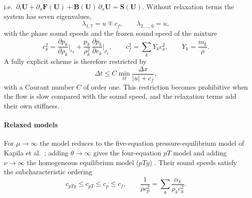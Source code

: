 \documentclass[a4paper,fleqn]{cas-sc}
\begin{document}
i.e.\ $\partial_t\mathbf U+\partial_x\mathbf F(\mathbf U)+\mathbf B(\mathbf U)\,\partial_x\mathbf U=\mathbf S(\mathbf U)$. Without relaxation terms the system has seven eigenvalues,
\begin{equation}
\lambda_{1,7}=u\mp c_f,\qquad \lambda_{2,\dots,6}=u,
\label{eq:eigs}
\end{equation}
with the phase sound speeds and the frozen sound speed of the mixture
\begin{equation}
c_k^2=\frac{\partial p_k}{\partial\rho_k}\Big|_{e_k}+\frac{p_k}{\rho_k^2}\,\frac{\partial p_k}{\partial e_k}\Big|_{\rho_k},\qquad
c_f^2=\sum_kY_kc_k^2,\qquad Y_k=\frac{m_k}{\rho} .
\label{eq:cf}
\end{equation}
A fully explicit scheme is therefore restricted by
\begin{equation}
\Delta t\le C\min_\Omega\frac{\Delta x}{|u|+c_f},
\label{eq:cfl_explicit}
\end{equation}
with a Courant number $C$ of order one. This restriction becomes prohibitive when the flow is slow compared with the sound speed, and the relaxation terms add their own
stiffness.

\paragraph{Relaxed models}
For $\mu\to\infty$ the model reduces to the five-equation pressure-equilibrium model of Kapila et al.\ \cite{Kapila2001};
adding $\theta\to\infty$ gives the four-equation $pT$ model and adding $\nu\to\infty$ the homogeneous equilibrium model ($pTg$)
\cite{Pelanti2022}. Their sound speeds satisfy the subcharacteristic ordering \cite{FlattenLund2011}
\begin{equation}
c_{pTg}\le c_{pT}\le c_p\le c_f,\qquad \frac1{\rho c_p^2}=\sum_k\frac{\alpha_k}{\rho_kc_k^2} .
\label{eq:subchar}
\end{equation}
\end{document}
